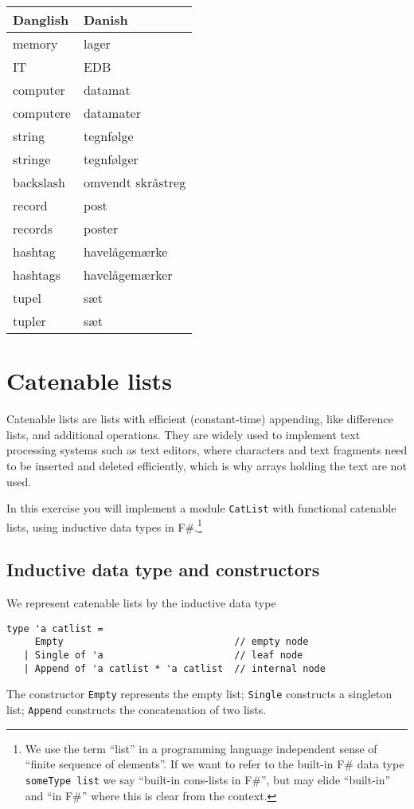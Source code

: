 \documentclass[a4paper,11pt]{article}
\begin{document}
\begin{tabular}{|l|l|} \hline
Danglish & Danish \\ \hline
memory & lager \\
IT & EDB \\
computer & datamat \\
computere & datamater \\
string & tegnf\o lge \\
stringe & tegnf\o lger \\
backslash & omvendt skr\aa streg \\
record & post \\
records & poster \\
hashtag & havel\aa gem\ae rke \\
hashtags & havel\aa gem\ae rker \\
tupel & s\ae t \\ 
tupler & s\ae t \\ \hline
\end{tabular}

\section{Catenable lists}

Catenable lists are lists with efficient (constant-time) appending, like difference lists, and additional operations.  They are widely used to implement text processing systems such as text editors, where characters and text fragments need to be inserted and deleted efficiently, which is why arrays holding the text are not used.

In this exercise you will implement a module \texttt{CatList} with functional catenable lists, using inductive data types in F\#.\footnote{We use the term ``list'' in a programming language independent sense of ``finite sequence of elements''.  If we want to refer to the built-in F\# data type \texttt{someType list} we say ``built-in cons-lists in F\#'', but may elide ``built-in'' and ``in F\#'' where this is clear from the context.}

\subsection{Inductive data type and constructors}

We represent catenable lists by the inductive data type 
\begin{verbatim}
type 'a catlist = 
     Empty                              // empty node
   | Single of 'a                       // leaf node
   | Append of 'a catlist * 'a catlist  // internal node
\end{verbatim}
The constructor \texttt{Empty} represents the empty list; \texttt{Single} constructs a singleton list; \texttt{Append} constructs the concatenation of two lists.
\end{document}
